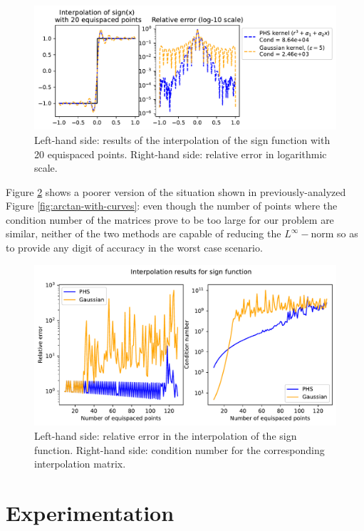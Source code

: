 \documentclass[12pt]{report} %
\begin{document}
\begin{figure}[ht]
    \centering
    \includegraphics[width=\textwidth]{imagenes/experiments/1d/intro/sign-with-20-pts.pdf}
    \caption{Left-hand side: results of the interpolation of the sign function with 20 equispaced points. Right-hand side: relative error in logarithmic scale.}
    \label{fig:sign-with-20-pts}
\end{figure}

Figure \ref{fig:sign-with-curves} shows a poorer version of the situation shown in previously-analyzed Figure \ref{fig:arctan-with-curves}: even though the number of points where the condition number of the matrices prove to be too large for our problem are similar, neither of the two methods are capable of reducing the $L^\infty-$norm so as to provide any digit of accuracy in the worst case scenario.

\begin{figure}[ht]
    \centering
    \includegraphics[width=.8\textwidth]{imagenes/experiments/1d/intro/sign-interpolation-curves.pdf}
    \caption{Left-hand side: relative error in the interpolation of the sign function. Right-hand side: condition number for the corresponding interpolation matrix.}
    \label{fig:sign-with-curves}
\end{figure}



\chapter{Experimentation}
\end{document}
